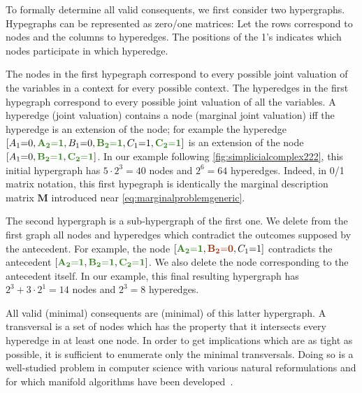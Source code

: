 {To formally determine all valid consequents, we first consider two hypergraphs. Hypegraphs can be represented as zero/one matrices: Let the rows correspond to nodes and the columns to hyperedges. The positions of the 1's indicates which nodes participate in which hyperedge.  %

The nodes in the first hypegraph correspond to every possible joint valuation of the variables in a context for every possible context.
The hyperedges in the first hypegraph correspond to every possible joint valuation of all the variables. A hyperedge (joint valuation) contains a node (marginal joint valuation) iff the hyperedge is an extension of the node; for example the hyperedge $\bracks{A_1 \eql 0, \mgreen{A_2 \eql 1}, B_1 \eql 0, \mgreen{B_2 \eql 1}, C_1 \eql 1, \mgreen{C_2 \eql 1}}$ is an extension of the node $\bracks{A_1 \eql 0,  \mgreen{B_2 \eql 1}, \mgreen{C_2 \eql 1}}$. In our example following \cref{fig:simplicialcomplex222}, this initial hypergraph has $5\cdot 2^3 = 40$ nodes and $2^6 = 64$ hyperedges. Indeed, in 0/1 matrix notation, this first hypegraph is identically the marginal description matrix $\bm{M}$ introduced near \cref{eq:marginalproblemgeneric}.

The second hypergraph is a sub-hypergraph of the first one. We delete from the first graph all nodes and hyperedges which contradict the outcomes supposed by the antecedent. For example, the node $\bracks{\mgreen{A_2 \eql 1}, \mred{B_2 \eql 0}, C_1 \eql 1}$ contradicts the antecedent $\bracks{\mgreen{A_2 \eql 1}, \mgreen{B_2 \eql 1}, \mgreen{C_2 \eql 1}}$. We also delete the node corresponding to the antecedent itself. In our example, this final resulting hypergraph has $2^3 + 3\cdot 2^1 = 14$ nodes and $2^3 = 8$ hyperedges.

All valid (minimal) consequents are (minimal)  of this latter hypergraph. A transversal is a set of nodes which has the property that it intersects every hyperedge in at least one node. In order to get implications which are as tight as possible, it is sufficient to enumerate only the minimal transversals. Doing so is a well-studied problem in computer science with various natural reformulations and for which manifold algorithms have been developed~\cite{eiter_dualization_2008}.

}
